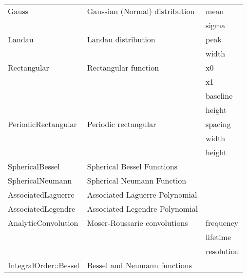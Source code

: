 \documentclass{report}
\begin{document}
\begin{table*}
\begin{center}
\begin{tabular}{|l|l|l|}
Gauss                          & Gaussian (Normal) distribution    & mean                    \\ 
                               &                                   & sigma                   \\ \hline
Landau                         & Landau distribution               & peak                    \\ 
                               &                                   & width                   \\ \hline
Rectangular                    & Rectangular function              & x0                      \\ 
                               &                                   & x1                      \\ 
                               &                                   & baseline                \\ 
                               &                                   & height                  \\ \hline
PeriodicRectangular            & Periodic rectangular              & spacing                 \\
                               &                                   & width                   \\ 
                               &                                   & height                  \\ \hline
SphericalBessel                & Spherical Bessel Functions        &                         \\ \hline
SphericalNeumann               & Spherical Neumann Function        &                         \\ \hline
AssociatedLaguerre             & Associated Laguerre Polynomial    &                         \\ \hline
AssociatedLegendre             & Associated Legendre Polynomial    &                         \\ \hline
AnalyticConvolution            & Moser-Roussarie convolutions      & frequency               \\       
                               &                                   & lifetime                \\       
                               &                                   & resolution              \\ \hline
IntegralOrder::Bessel          & Bessel and Neumann functions      &                         \\ \hline

\end{tabular}
\end{center}
\end{table*}
\end{document}
